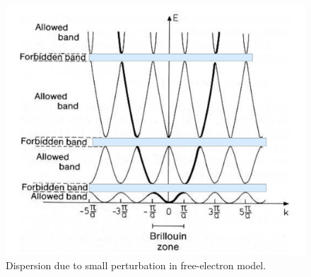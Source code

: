 \documentclass[10pt]{article}
\begin{document}
\begin{figure}
  \centering
    \includegraphics[width=\textwidth]{tb8}
    \caption{Dispersion due to small perturbation in free-electron model.}
\end{figure}
\end{document}
